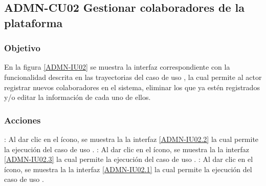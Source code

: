 \clearpage
\subsection{ADMN-CU02 Gestionar colaboradores de la plataforma}

\subsubsection{Objetivo}
En la figura \ref{ADMN-IU02} se muestra la interfaz correspondiente con la funcionalidad descrita en las trayectorias del caso de 
uso , la cual permite al actor registrar nuevos colaboradores en el sistema, eliminar los que ya estén registrados y/o editar 
la información de cada uno de ellos.

\subsubsection{Acciones}

\Titem \IUAgregar{}: Al dar clic en el ícono, se muestra la la interfaz \ref{ADMN-IU02.2} la cual permite la ejecución del caso de uso .
\Titem \IUEditar{}: Al dar clic en el ícono, se muestra la la interfaz \ref{ADMN-IU02.3} la cual permite la ejecución del caso de uso .
\Titem \IUEliminar{}: Al dar clic en el ícono, se muestra la la interfaz \ref{ADMN-IU02.1} la cual permite la ejecución del caso de uso .


\clearpage
